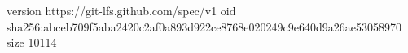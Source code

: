 version https://git-lfs.github.com/spec/v1
oid sha256:abceb709f5aba2420c2af0a893d922ce8768e020249c9e640d9a26ae53058970
size 10114

